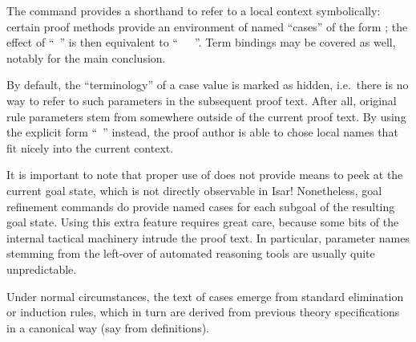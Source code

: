 \begin{isabellebody}
\begin{isamarkuptext}
  The \mbox{} command provides a shorthand to refer to a
  local context symbolically: certain proof methods provide an
  environment of named ``cases'' of the form ; the effect of ``\mbox{}~'' is then equivalent to ``\mbox{}~~\mbox{}~''.  Term bindings may be covered as well, notably
  \mbox{} for the main conclusion.

  By default, the ``terminology''  of
  a case value is marked as hidden, i.e.\ there is no way to refer to
  such parameters in the subsequent proof text.  After all, original
  rule parameters stem from somewhere outside of the current proof
  text.  By using the explicit form ``\mbox{}~'' instead, the proof author is able to
  chose local names that fit nicely into the current context.

  \medskip It is important to note that proper use of \mbox{} does not provide means to peek at the current goal state,
  which is not directly observable in Isar!  Nonetheless, goal
  refinement commands do provide named cases 
  for each subgoal  of the resulting goal state.
  Using this extra feature requires great care, because some bits of
  the internal tactical machinery intrude the proof text.  In
  particular, parameter names stemming from the left-over of automated
  reasoning tools are usually quite unpredictable.

  Under normal circumstances, the text of cases emerge from standard
  elimination or induction rules, which in turn are derived from
  previous theory specifications in a canonical way (say from
  \mbox{} definitions).


\end{isamarkuptext}
\end{isabellebody}
